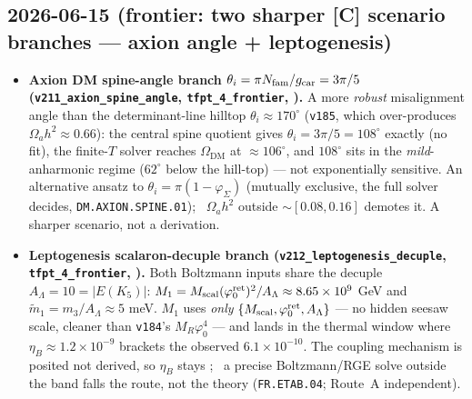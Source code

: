 \subsection*{2026-06-15 (frontier: two sharper [C] scenario branches --- axion angle + leptogenesis)}
\begin{itemize}
\item \textbf{Axion DM spine-angle branch $\theta_i=\pi N_{\mathrm{fam}}/g_{\mathrm{car}}=3\pi/5$ (\texttt{v211\_axion\_spine\_angle},
  \texttt{tfpt\_4\_frontier}, \mC).} A more \emph{robust} misalignment angle than the determinant-line hilltop
  $\theta_i\approx170^\circ$ (\texttt{v185}, which over-produces $\Omega_a h^2\approx0.66$): the central spine
  quotient gives $\theta_i=3\pi/5=108^\circ$ exactly (no fit), the finite-$T$ solver reaches
  $\Omega_{\mathrm{DM}}$ at ${\approx}106^\circ$, and $108^\circ$ sits in the \emph{mild}-anharmonic regime
  ($62^\circ$ below the hill-top) --- not exponentially sensitive. An alternative ansatz to
  $\theta_i=\pi(1-\varphi_\Sigma)$ (mutually exclusive, the full solver decides, \texttt{DM.AXION.SPINE.01});
  \mX\ $\Omega_a h^2$ outside ${\sim}[0.08,0.16]$ demotes it. A sharper scenario, not a derivation.
\item \textbf{Leptogenesis scalaron-decuple branch (\texttt{v212\_leptogenesis\_decuple},
  \texttt{tfpt\_4\_frontier}, \mC).} Both Boltzmann inputs share the decuple $A_\Lambda=10=|E(K_5)|$:
  $M_1=M_{\mathrm{scal}}(\varphi_0^{\mathrm{ret}})^2/A_\Lambda\approx8.65\times10^9$ GeV and $\tilde m_1=m_3/A_\Lambda\approx5$ meV.
  $M_1$ uses \emph{only} $\{M_{\mathrm{scal}},\varphi_0^{\mathrm{ret}},A_\Lambda\}$ --- no hidden seesaw scale, cleaner than
  \texttt{v184}'s $M_R\varphi_0^4$ --- and lands in the thermal window where $\eta_B\approx1.2\times10^{-9}$
  brackets the observed $6.1\times10^{-10}$. The coupling mechanism is posited not derived, so $\eta_B$ stays
  \mC; \mX\ a precise Boltzmann/RGE solve outside the band falls the route, not the theory
  (\texttt{FR.ETAB.04}; Route~A independent).
\end{itemize}

